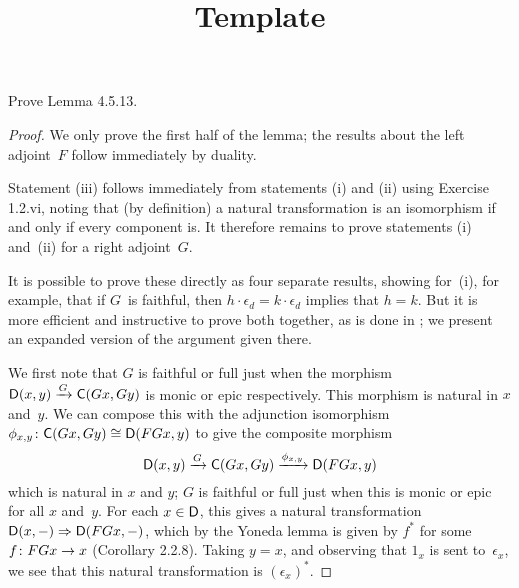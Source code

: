 \documentclass[../../solutions]{subfiles}
\title{Template}
\author{}
\begin{document}
\maketitle

%   

\begin{exercise}
  Prove Lemma 4.5.13.
\end{exercise}

\begin{proof}
  We only prove the first half of the lemma; the results about the
  left adjoint~$F$ follow immediately by duality.

  Statement (iii) follows immediately from statements (i) and (ii)
  using Exercise 1.2.vi, noting that (by definition) a natural
  transformation is an isomorphism if and only if every component is.
  It therefore remains to prove statements (i) and~(ii) for a right
  adjoint~$G$.

  It is possible to prove these directly as four separate results,
  showing for~(i), for example, that if $G$~is faithful, then
  $h\cdot\epsilon_d = k\cdot\epsilon_d$ implies that $h=k$.  But it is
  more efficient and instructive to prove both together, as is done in
  \cite[90--91]{catworking}; we present an expanded version of the
  argument given there.

  We first note that $G$ is faithful or full just when the morphism
  ${\mathsf{D}}(x,y)\xrightarrow{G} {\mathsf{C}}(Gx,Gy)$ is monic or epic respectively.
  This morphism is natural in $x$ and~$y$.  We can compose this with
  the adjunction isomorphism
  ${\phi_{x,y}}\colon{{\mathsf{C}}(Gx,Gy)}\cong{{\mathsf{D}}(FGx,y)}$ to give the composite
  morphism
  $${\mathsf{D}}(x,y)\xrightarrow{G} {\mathsf{C}}(Gx,Gy) \xrightarrow{\phi_{x,y}}
  {\mathsf{D}}(FGx,y)$$
  which is natural in $x$ and $y$; $G$ is faithful or full just when
  this is monic or epic for all $x$ and~$y$.  For each $x\in{\mathsf{D}}$, this
  gives a natural transformation ${\mathsf{D}}(x,-)\Rightarrow {\mathsf{D}}(FGx,-)$,
  which by the Yoneda lemma is given by $f^*$ for some
  ${f}\colon{FGx}\to{x}$ (Corollary 2.2.8).  Taking $y=x$, and observing
  that $1_x$ is sent to~$\epsilon_x$, we see that this natural
  transformation is $(\epsilon_x)^*$.


\end{proof}
\end{document}
